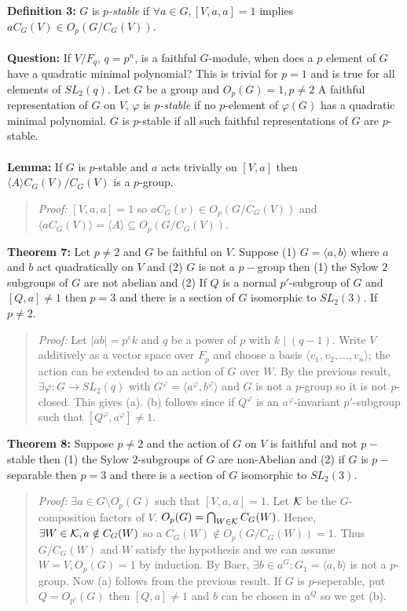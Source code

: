 {\bf Definition 3:} $G$ is \emph {$p$-stable} if $\forall a \in G, [V,a,a]=1$ implies 
$a C_G(V) \in O_p ( G/C_G(V))$.
\\
\\
{\bf Question:}  If $V/F_q$, $q= p^n$, is a faithful $G$-module, when does a $p$ element of
$G$ have a quadratic minimal polynomial?  This is trivial for $p=1$ and is true for
all elements of $SL_2(q)$.  Let $G$ be a group and $O_p(G)=1, p \ne 2$
A faithful representation of $G$ on $V$, $\varphi$ is \emph{$p$-stable} if
no $p$-element of $\varphi(G)$ has a quadratic minimal polynomial.  $G$ is $p$-stable
if all such faithful representations of $G$ are $p$-stable.
\\
\\
{\bf Lemma:} If $G$ is $p$-stable and $a$ acts trivially on $[V,a]$ then $ \langle A \rangle 
C_G(V)/C_G(V)$ 
is a $p$-group.
\begin{quote}
\emph{Proof:}  
$[V,a,a]=1$ so $a C_G(v) 
\in O_p(G/C_G(V))$ and $\langle a C_G(V) \rangle = \langle A \rangle
\subseteq  O_p(G/C_G(V))$.
\end{quote}
{\bf Theorem 7:} Let $p \ne 2$ and $G$ be faithful on $V$.
Suppose (1) $G= \langle a,b \rangle $ where $a$ and $b$ act quadratically on $V$ and
(2) $G$ is not a $p-$group then (1) the Sylow $2$ subgroups of $G$ are not abelian and
(2) If $Q$ is a normal $p'$-subgroup of $G$ and $[Q,a] \ne 1$ then $p=3$ and there
is a section of $G$ isomorphic to $SL_2(3)$.  If $p \ne 2$.
\begin{quote}
\emph{Proof:}  
Let $|ab|= p^e k$ and $q$ be a power of $p$ with $k \mid (q-1)$.  Write $V$ additively
as a vector space over $F_p$ and choose a basis $ \langle v_1 , v_2 , \ldots , v_n \rangle $; 
the action
can be extended to an action of $G$ over $W$.  By the previous result,
$\exists \varphi: G \rightarrow SL_2(q)$ with 
$G^{\varphi}= \langle a^{\varphi}, b^{\varphi} \rangle $ and
$G$ is not a $p$-group so it is not $p$-closed.  This gives (a).  (b) follows since
if $Q^{\varphi}$ is an $a^{\varphi}$-invariant $p'$-subgroup
such that $[Q^{\varphi}, a^{\varphi}] \ne 1$.
\end{quote}
{\bf Theorem 8:}
Suppose $p \ne 2$ and the action of
$G$ on $V$ is faithful and not $p-$stable then (1) the Sylow $2$-subgroups of
$G$ are non-Abelian and (2) if $G$ is $p-$separable 
then $p=3$ and there is a section of
$G$ isomorphic to $SL_2(3)$.
\begin{quote}
\emph{Proof:}  
$\exists a \in G \setminus O_p(G)$ such that $[V,a,a] = 1$.  Let ${\cal K}$ be the
$G$-composition factors of $V$.  $O_p(G)= \bigcap_{W \in {\cal K}} C_G(W)$.  Hence,
$\exists W \in {\cal K}, a \notin C_G(W)$ so a $C_G(W) \notin O_p(G/C_G(W)) = 1$.
Thus $G/C_G(W)$ and $W$ satisfy the hypothesis and we can assume $W=V, O_p(G)=1$ by
induction.  By Baer, $\exists b \in a^G: G_1 = \langle a,b \rangle $ is not a $p$-group.  Now
(a) follows from the previous result.  If $G$ is $p$-seperable, put $Q= O_{p'}(G)$ then
$[Q, a] \ne 1$ and $b$ can be chosen in $a^Q$ so we get (b).
\end{quote}
